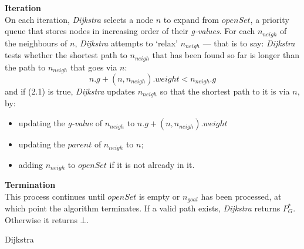 \documentclass[12pt,notitlepage]{report}
\begin{document}
\noindent
{\bf Iteration}\\
\noindent
On each iteration, {\em Dijkstra} selects a node $n$ to expand from $openSet$, a priority queue that stores nodes in increasing order of their {\em g-values}. For each $n_{neigh}$ of the neighbours of $n$, {\em Dijkstra} attempts to `relax' $n_{neigh}$ --- that is to say: {\em Dijkstra} tests whether the shortest path to $n_{neigh}$ that has been found so far is longer than the path to $n_{neigh}$ that goes via $n$:
\begin{equation}
n.g + (n,n_{neigh}).weight < n_{neigh}.g
\end{equation}
\noindent
and if (2.1) is true, {\em Dijkstra} updates $n_{neigh}$ so that the shortest path to it is via $n$, by: 
\begin{itemize}
\item updating the {\em g-value} of $n_{neigh}$ to $n.g + (n,n_{neigh}).weight$  
\item updating the $parent$ of $n_{neigh}$ to $n$;
\item adding $n_{neigh}$ to $openSet$ if it is not already in it.
\end{itemize}

\noindent
{\bf Termination}\\
\noindent
This process continues until $openSet$ is empty or $n_{goal}$ has been processed, at which point the algorithm terminates. If a valid path exists, {\em Dijkstra} returns $P^{*}_{G}$. Otherwise it returns $\bot$.\

\begin{algorithm}
  \SetAlgoLined\DontPrintSemicolon
  \setcounter{AlgoLine}{0}
  \caption{{\sc Dijkstra}}
\end{algorithm} 
\end{document}
